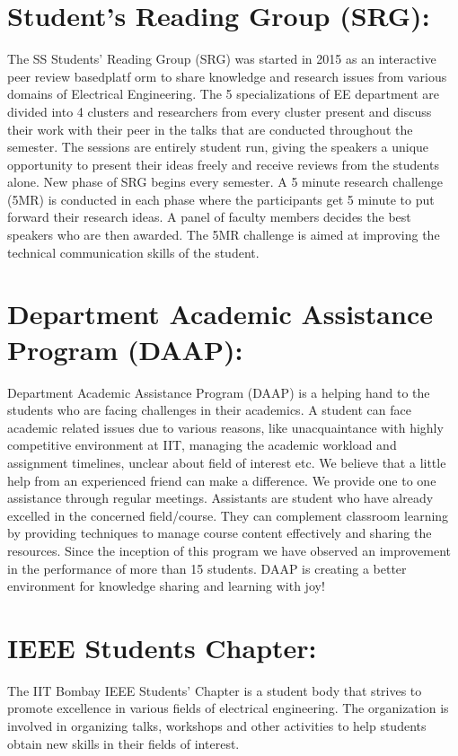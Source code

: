\documentclass[openany]{book} %
\begin{document}
\section {Student's Reading Group (SRG):}
The SS Students’ Reading Group (SRG) was started in 2015 as an interactive peer review basedplatf orm to share knowledge and research issues from various domains of Electrical Engineering. The 5 specializations of EE department are divided into 4 clusters and researchers from every cluster present and discuss their work with their peer in the talks that are conducted throughout the semester. The sessions are entirely student run, giving the speakers a unique opportunity to present their ideas freely and receive reviews from the students alone.\newline
New phase of SRG begins every semester. A 5 minute research challenge (5MR) is conducted in each phase where the participants get 5 minute to put forward their research ideas. A panel of faculty members decides the best speakers who are then awarded. The 5MR challenge is aimed
at improving the technical communication skills of the student.
\section {Department Academic Assistance Program (DAAP):}
Department Academic Assistance Program (DAAP) is a helping hand to the students who are facing challenges in their academics. A student can face academic related issues due to various reasons, like unacquaintance with highly competitive environment at IIT, managing the academic
workload and assignment timelines, unclear about field of interest etc. We believe that a little help from an experienced friend can make a difference. We provide one to one assistance through regular meetings. Assistants are student who have already excelled in the concerned field/course. They can complement classroom learning by providing techniques to manage course content effectively and sharing the resources. Since the inception of this program we have observed an improvement in the performance of more than 15 students. DAAP is creating a better environment for knowledge sharing and learning with joy!
\newline
\section {IEEE Students Chapter:}
The IIT Bombay IEEE Students’ Chapter is a student body that strives to promote excellence in various fields of electrical engineering. The organization is involved in organizing talks, workshops and other activities to help students obtain new skills in their fields of interest.\newline
\end{document}
